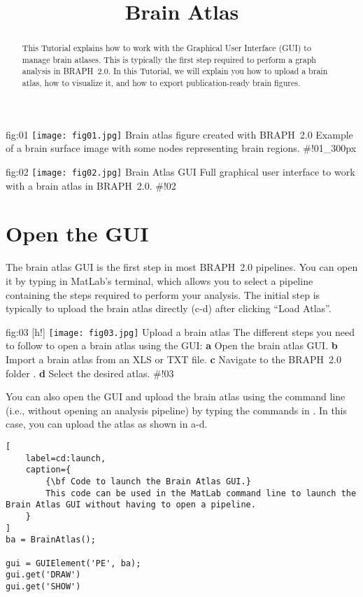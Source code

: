 \documentclass[justified]{tufte-handout}
\title{Brain Atlas}
\begin{document}
\maketitle
	
	{fig:01}
	{\texttt{[image: fig01.jpg]}}
	{Brain atlas figure created with BRAPH~2.0}
	{
	Example of a brain surface image with some nodes representing brain regions.
	}
#!01_300px
\begin{abstract}
\noindent
This Tutorial explains how to work with the Graphical User Interface (GUI) to manage brain atlases.
This is typically the first step required to perform a graph analysis in BRAPH~2.0. 
In this Tutorial, we will explain you how to upload a brain atlas, how to visualize it, and how to export publication-ready brain figures.
\end{abstract}

\tableofcontents

	{fig:02}
	{\texttt{[image: fig02.jpg]}}
	{Brain Atlas GUI}
	{
	Full graphical user interface to work with a brain atlas in BRAPH~2.0. 
	}
#!02
\clearpage
\section{Open the GUI}

The brain atlas GUI is the first step in most BRAPH~2.0 pipelines. You can open it by typing  in MatLab's terminal, which allows you to select a pipeline containing the steps required to perform your analysis. The initial step is typically to upload the brain atlas directly (c-d) after clicking ``Load Atlas''. 

	{fig:03}
	{
	[h!]
	\texttt{[image: fig03.jpg]}
	}
	{Upload a brain atlas}
	{
	The different steps you need to follow to open a brain atlas using the GUI: 
	{\bf a} Open the brain atlas GUI.
	{\bf b} Import a brain atlas from an XLS or TXT file.
	{\bf c} Navigate to the BRAPH~2.0 folder .
	{\bf d} Select the desired atlas.
	}
#!03

\begin{tcolorbox}[
	title=Brain Atlas GUI launch from command line
]
You can also open the GUI and upload the brain atlas using the command line (i.e., without opening an analysis pipeline) by typing the commands in . In this case, you can upload the atlas as shown in a-d.

\begin{lstlisting}[
	label=cd:launch,
	caption={
		{\bf Code to launch the Brain Atlas GUI.}
		This code can be used in the MatLab command line to launch the  Brain Atlas GUI without having to open a pipeline.
	}
]
ba = BrainAtlas();

gui = GUIElement('PE', ba);
gui.get('DRAW')
gui.get('SHOW')
\end{lstlisting}
\end{tcolorbox}
\end{document}
